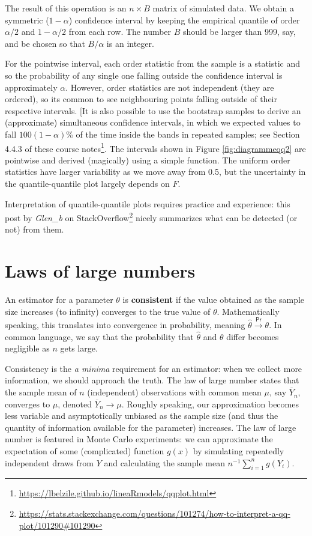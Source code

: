 \documentclass[
  11pt,
  letterpaper,
]{book}
\renewcommand{\href}[2]{#2\footnote{\url{#1}}}
\theoremstyle{definition}
\theoremstyle{definition}
\theoremstyle{definition}
\theoremstyle{definition}
\theoremstyle{remark}
\begin{document}
The result of this operation is an \(n \times B\) matrix of simulated data. We obtain a symmetric (\(1-\alpha\)) confidence interval by keeping the empirical quantile of order \(\alpha/2\) and \(1-\alpha/2\) from each row. The number \(B\) should be larger than 999, say, and be chosen so that \(B/\alpha\) is an integer.

For the pointwise interval, each order statistic from the sample is a statistic and so the probability of any single one falling outside the confidence interval is approximately \(\alpha\). However, order statistics are not independent (they are ordered), so its common to see neighbouring points falling outside of their respective intervals. {[}It is also possible to use the bootstrap samples to derive an (approximate) simultaneous confidence intervals, in which we expected values to fall \(100(1-\alpha)\)\% of the time inside the bands in repeated samples; \href{https://lbelzile.github.io/lineaRmodels/qqplot.html}{see Section 4.4.3 of these course notes}. The intervals shown in Figure \ref{fig:diagrammeqq2} are pointwise and derived (magically) using a simple function. The uniform order statistics have larger variability as we move away from 0.5, but the uncertainty in the quantile-quantile plot largely depends on \(F\).

Interpretation of quantile-quantile plots requires practice and experience: \href{https://stats.stackexchange.com/questions/101274/how-to-interpret-a-qq-plot/101290\#101290}{this post by \emph{Glen\_b} on StackOverflow} nicely summarizes what can be detected (or not) from them.

\hypertarget{law-large-numbers}{%
\section{Laws of large numbers}\label{law-large-numbers}}

An estimator for a parameter \(\theta\) is \textbf{consistent} if the value obtained as the sample size increases (to infinity) converges to the true value of \(\theta\). Mathematically speaking, this translates into convergence in probability, meaning \(\hat{\theta} \stackrel{\mathsf{Pr}}{\to} \theta\). In common language, we say that the probability that \(\hat{\theta}\) and \(\theta\) differ becomes negligible as \(n\) gets large.

Consistency is the \emph{a minima} requirement for an estimator: when we collect more information, we should approach the truth. The law of large number states that the sample mean of \(n\) (independent) observations with common mean \(\mu\), say \(\overline{Y}_n\), converges to \(\mu\), denoted \(\overline{Y}_n \rightarrow \mu\). Roughly speaking, our approximation becomes less variable and asymptotically unbiased as the sample size (and thus the quantity of information available for the parameter) increases. The law of large number is featured in Monte Carlo experiments: we can approximate the expectation of some (complicated) function \(g(x)\) by simulating repeatedly independent draws from \(Y\) and calculating the sample mean \(n^{-1} \sum_{i=1}^n g(Y_i)\).
\end{document}
